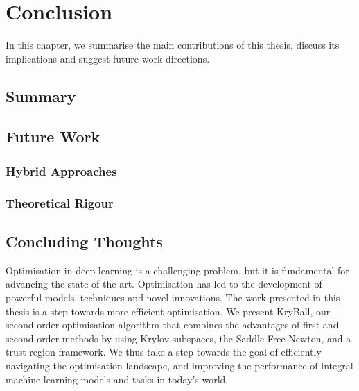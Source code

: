 \chapter{Conclusion}
\label{chap:conclusion}

In this chapter, we summarise the main contributions of this thesis, discuss its implications and suggest future work directions.

\section{Summary}

\section{Future Work}

\subsection{Hybrid Approaches}
\label{ssec:hybrid_approaches}

\subsection{Theoretical Rigour}
\label{sec:theoretical_rigour}

\section{Concluding Thoughts}
\label{sec:concluding_thoughts}

Optimisation in deep learning is a challenging problem, but it is fundamental for advancing the state-of-the-art. Optimisation has led to the development of powerful models, techniques and novel innovations. The work presented in this thesis is a step towards more efficient optimisation. We present KryBall, our second-order optimisation algorithm that combines the advantages of first and second-order methods by using Krylov subspaces, the Saddle-Free-Newton, and a trust-region framework. We thus take a step towards the goal of efficiently navigating the optimisation landscape, and improving the performance of integral machine learning models and tasks in today's world.